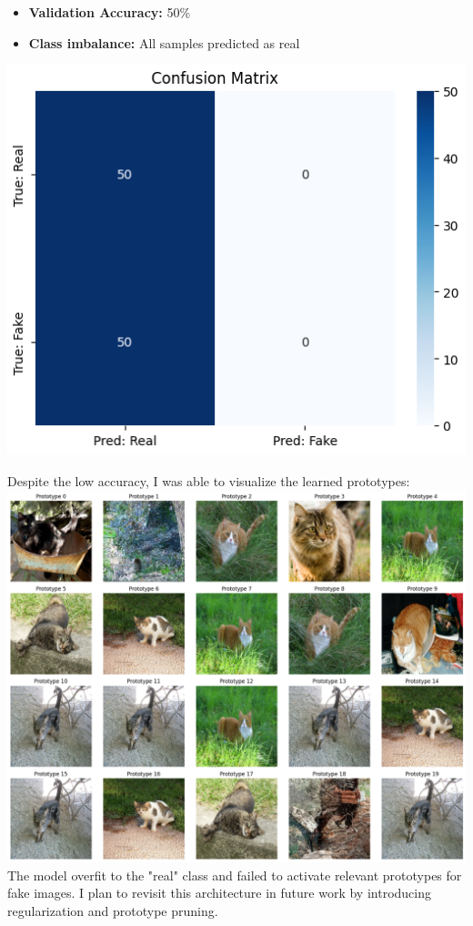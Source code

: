 \documentclass{article}
\begin{document}
\begin{itemize}
    \item \textbf{Validation Accuracy:} 50\%
    \item \textbf{Class imbalance:} All samples predicted as real
\end{itemize}

\includegraphics[width=0.6\linewidth]{img/protopnet_confmat.png}

Despite the low accuracy, I was able to visualize the learned prototypes:\\
\includegraphics[width=0.9\linewidth]{img/protopnet_prototypes.png}\\



The model overfit to the "real" class and failed to activate relevant prototypes for fake images. I plan to revisit this architecture in future work by introducing regularization and prototype pruning.
\end{document}

